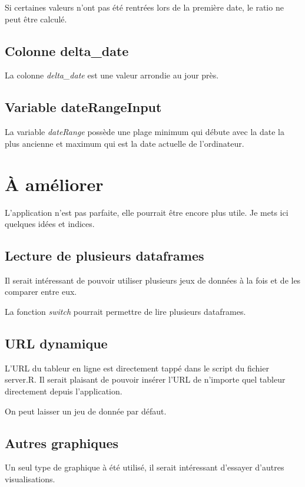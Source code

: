 \documentclass[]{book}
\begin{document}
Si certaines valeurs n'ont pas été rentrées lors de la première date, le
ratio ne peut être calculé.

\subsection{Colonne delta\_date}\label{colonne-delta_date}

La colonne \emph{delta\_date} est une valeur arrondie au jour près.

\subsection{Variable dateRangeInput}\label{variable-daterangeinput}

La variable \emph{dateRange} possède une plage minimum qui débute avec
la date la plus ancienne et maximum qui est la date actuelle de
l'ordinateur.

\section{À améliorer}\label{a-ameliorer}

L'application n'est pas parfaite, elle pourrait être encore plus utile.
Je mets ici quelques idées et indices.

\subsection{Lecture de plusieurs
dataframes}\label{lecture-de-plusieurs-dataframes}

Il serait intéressant de pouvoir utiliser plusieurs jeux de données à la
fois et de les comparer entre eux.

La fonction \emph{switch} pourrait permettre de lire plusieurs
dataframes.

\subsection{URL dynamique}\label{url-dynamique}

L'URL du tableur en ligne est directement tappé dans le script du
fichier server.R. Il serait plaisant de pouvoir insérer l'URL de
n'importe quel tableur directement depuis l'application.

On peut laisser un jeu de donnée par défaut.

\subsection{Autres graphiques}\label{autres-graphiques}

Un seul type de graphique à été utilisé, il serait intéressant d'essayer
d'autres visualisations.


\end{document}
